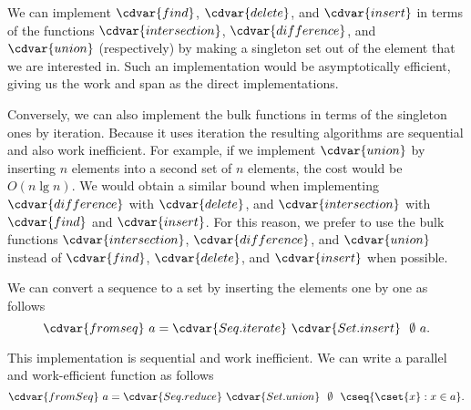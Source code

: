 \begin{gram}
We can implement $\cdvar{find}$, $\cdvar{delete}$, and $\cdvar{insert}$ in terms of
the functions $\cdvar{intersection}$, $\cdvar{difference}$, and $\cdvar{union}$
(respectively) by making a singleton set out of the element that we
are interested in.
%
Such an implementation would be asymptotically efficient, giving us
the work and span as the direct implementations.
%

Conversely, we can also implement the bulk functions in terms of the
singleton ones by iteration.
%
Because it uses iteration the resulting algorithms are
sequential and also work inefficient.
%
For example, if we implement $\cdvar{union}$ by inserting
$n$ elements into a second set of $n$ elements, the cost would be $O(n
\lg n)$.  
%
We would obtain a similar bound when implementing
$\cdvar{difference}$ with $\cdvar{delete}$, and $\cdvar{intersection}$ with
$\cdvar{find}$ and $\cdvar{insert}$.
%
For this reason, we prefer to use the bulk functions $\cdvar{intersection}$, $\cdvar{difference}$, and $\cdvar{union}$ instead
of $\cdvar{find}$, $\cdvar{delete}$, and $\cdvar{insert}$ when possible.
\end{gram}


\begin{example}
\label{ex:st::fromseq-imp}
We can  convert a sequence to a set by inserting the elements
one by one as follows
\[
\cdvar{fromseq}~a = \cdvar{Seq.iterate}~\cdvar{Set.insert}~~\emptyset~a.
\]

This implementation is sequential and work inefficient. 
%
We can write a parallel and work-efficient function as follows
\[
\cdvar{fromSeq}~a = \cdvar{Seq.reduce}~\cdvar{Set.union}~~\emptyset~~\cseq{\cset{x} : x \in a}.
\]

\end{example}


